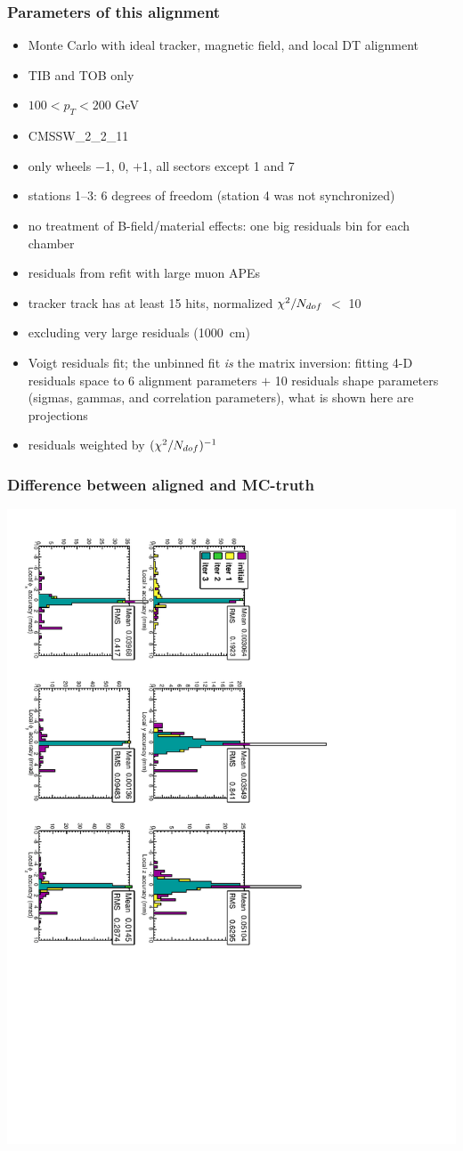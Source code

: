 \documentclass[compress]{beamer}
\begin{document}
\begin{frame}
\frametitle{Parameters of this alignment}

\scriptsize

\begin{itemize}
\item Monte Carlo with ideal tracker, magnetic field, and local DT alignment
\item TIB and TOB only
\item $100 < p_T < 200$ GeV
\item CMSSW\_2\_2\_11
\item only wheels $-$1, 0, $+$1, all sectors except 1 and 7
\item stations 1--3: 6 degrees of freedom (station 4 was not synchronized)
\item no treatment of B-field/material effects: one big residuals bin for each chamber
\item residuals from refit with large muon APEs
\item tracker track has at least 15 hits, normalized $\chi^2/N_{\scriptsize dof}$ $<$ 10
\item excluding very large residuals (1000~cm)
\item Voigt residuals fit; the unbinned fit {\it is} the matrix inversion: fitting 4-D residuals space to 6 alignment parameters $+$ 10 residuals shape parameters (sigmas, gammas, and correlation parameters), what is shown here are projections
\item residuals weighted by $(\chi^2/N_{\scriptsize dof})^{-1}$
\end{itemize}
\end{frame}

\begin{frame}
\frametitle{Difference between aligned and MC-truth}
\includegraphics[height=\linewidth, angle=90]{hip_MC.pdf}
\end{frame}
\end{document}
